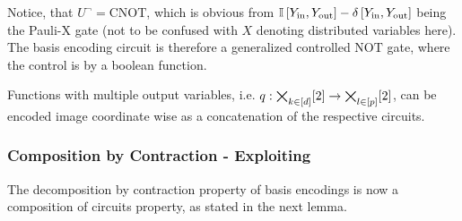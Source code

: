 \documentclass[aps,onecolumn,nofootinbib,pra]{article}
\newtheorem{definition}{Definition}
\begin{document}

    Notice, that $U^{\lnot} = \mathrm{CNOT}$, which is obvious from $\mathbb{I}\left[Y_{\mathrm{in}},Y_{\mathrm{out}}\right] - \delta\left[Y_{\mathrm{in}},Y_{\mathrm{out}}\right]$ being the Pauli-X gate (not to be confused with $X$ denoting distributed variables here).
    The basis encoding circuit is therefore a generalized controlled $\mathrm{NOT}$ gate, where the control is by a boolean function.

    Functions with multiple output variables, i.e. $q:\bigtimes_{k\in[d]}[2]\rightarrow\bigtimes_{l\in[p]}[2]$, can be encoded image coordinate wise as a concatenation of the respective circuits.

    \subsubsection{Composition by Contraction - Exploiting \DecompositionSparsity{}}

    The decomposition by contraction property of basis encodings is now a composition of circuits property, as stated in the next lemma.
\end{document}
